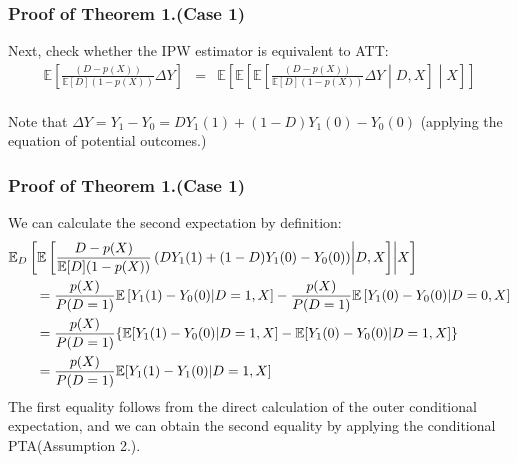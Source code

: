 \documentclass[fleqn]{beamer}
\begin{document}
\begin{frame}\frametitle{Proof of Theorem 1.(Case 1)}
    Next, check whether the IPW estimator is equivalent to ATT:
    \begin{eqnarray*}
        \mathbb{E}\left[\frac{(D-p(X))}{\mathbb{E}[D](1-p(X))}\Delta Y \right] &=&\mathbb{E}\left[\mathbb{E}\left[\mathbb{E}\left[\frac{(D-p(X))}{\mathbb{E}[D](1-p(X))}\Delta Y\middle|D,X\right]\middle|X\right]\right] \\
    \end{eqnarray*}

    Note that $\Delta Y = Y_{1} - Y_{0} = DY_{1}(1) + (1-D)Y_{1}(0) - Y_{0}(0)$ (applying the equation of potential outcomes.) \\
\end{frame}

\begin{frame}\frametitle{Proof of Theorem 1.(Case 1)}
    We can calculate the second expectation by definition:
    \footnotesize
    \begin{align*}
        \MoveEqLeft
        \mathbb{E}_{D}\left[\mathbb{E}\left[\frac{D-p(X)}{\mathbb{E}[D](1-p(X))}\left(DY_{1}(1) + (1-D)Y_{1}(0) - Y_{0}(0)\right)\middle|D,X\right]\middle|X \right]
        \\&= 
        \frac{p(X)}{P(D = 1)}\mathbb{E}\left[Y_{1}(1) - Y_{0}(0)\middle|D = 1, X\right] - \frac{p(X)}{P(D = 1)}\mathbb{E}\left[Y_{1}(0) - Y_{0}(0)\middle|D = 0, X \right]
        \\&= 
        \frac{p(X)}{P(D = 1)} \{ \mathbb{E}[Y_{1}(1) - Y_{0}(0)|D = 1, X] - \mathbb{E}[Y_{1}(0) - Y_{0}(0)|D = 1, X] \}
        \\&=
        \frac{p(X)}{P(D = 1)}\mathbb{E}[Y_{1}(1) - Y_{1}(0)|D = 1, X]
    \end{align*}
    \normalsize
    The first equality follows from the direct calculation of the outer conditional expectation, and we can obtain the second equality by applying the conditional PTA(Assumption 2.).
\end{frame}
\end{document}
